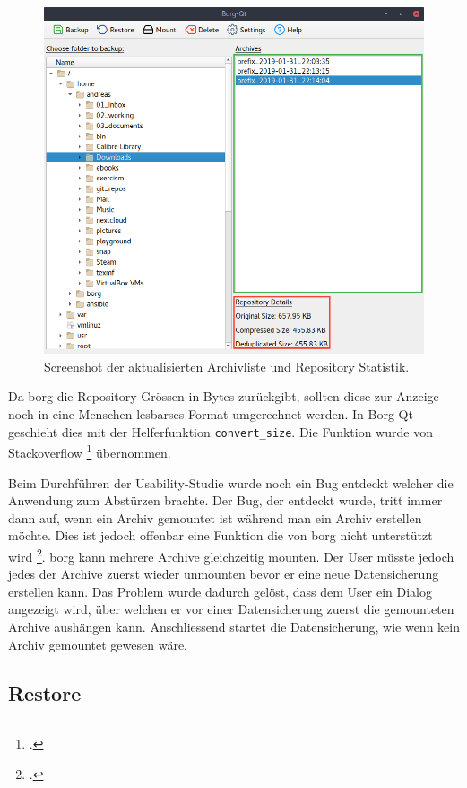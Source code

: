 \begin{figure}[htbp]
\centering
\includegraphics[width=.9\linewidth]{pictures/borgqt_archive_list.png}
\caption{\label{fig:org24ed7cf}
Screenshot der aktualisierten Archivliste und Repository Statistik.}
\end{figure}

Da \gls{borg} die Repository Grössen in Bytes zurückgibt, sollten diese zur
Anzeige noch in eine Menschen lesbarses Format umgerechnet werden. In Borg-Qt
geschieht dies mit der Helferfunktion \texttt{convert\_size}. Die Funktion wurde von
Stackoverflow \footcite{sizeformat} übernommen.

Beim Durchführen der Usability-Studie wurde noch ein Bug entdeckt welcher die
Anwendung zum Abstürzen brachte. Der Bug, der entdeckt wurde, tritt immer dann
auf, wenn ein Archiv gemountet ist während man ein Archiv erstellen möchte.
Dies ist jedoch offenbar eine Funktion die von \gls{borg} nicht unterstützt wird
\footcite{borgmountissue}. \gls{borg} kann mehrere Archive gleichzeitig mounten.\newpage
Der User müsste jedoch jedes der Archive zuerst wieder unmounten bevor er eine
neue Datensicherung erstellen kann. Das Problem wurde dadurch gelöst, dass dem
User ein Dialog angezeigt wird, über welchen er vor einer Datensicherung zuerst
die gemounteten Archive aushängen kann. Anschliessend startet die
Datensicherung, wie wenn kein Archiv gemountet gewesen wäre.

\subsection{Restore}
\label{sec:org5c152c9}

